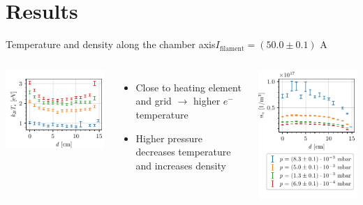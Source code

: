 \documentclass[10pt]{beamer}
\newcommand{\filamentcurrent}{\ensuremath{I_{\mathrm{filament}}}}
\newcommand{\electron}[0]{$e^{-}$}
\begin{document}
\section{Results}
\begin{frame}{Temperature and density along the chamber axis}{$\filamentcurrent = (50.0 \pm 0.1)$ A}
    \begin{columns}[T]
        \centering
        {\includegraphics[scale=1]{../figures/temperatureeV_position.pdf}}
        \begin{itemize}
            \item Close to heating element and grid \(\rightarrow\) higher \electron temperature
            \item Higher pressure decreases temperature and increases density
        \end{itemize}

        \centering
        {\includegraphics[scale=1]{../figures/density_position.pdf}}
    \end{columns}

\end{frame}
    
\end{document}
